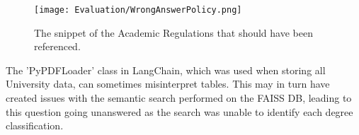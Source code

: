 \begin{figure}[H]
    \centering
    \texttt{[image: Evaluation/WrongAnswerPolicy.png]}
    \caption{The snippet of the Academic Regulations that should have been referenced. \autocite{bcuPoliciesProcedures} \label{fig:WrongAnswer2Snippet}}
\end{figure}

\noindent The 'PyPDFLoader' class in LangChain, which was used when storing all University data, can sometimes misinterpret tables. 
This may in turn have created issues with the semantic search performed on the FAISS DB, leading to this question going unanswered as 
the search was unable to identify each degree classification.